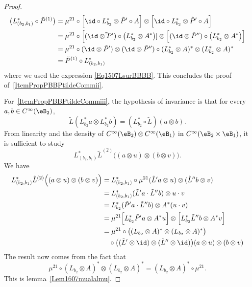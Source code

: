 \begin{proof}
	\begin{equation}
		\begin{aligned}[]
			\big( L^*_{(b_2,b_1)}\circ\tilde P^{(1)} \big)&=
			\mu^{21}\circ\Big[ \id\circ L^*_{b_2}\otimes\tilde P'\circ A \Big]\otimes\Big[  \id\circ L^*_{b_2}\otimes\tilde P'\circ A  \Big]\\
			&=\mu^{21}\circ\Big[(\id\otimes\tilde \tilde P')\circ\big( L^*_{b_2}\otimes A^* \big)]\otimes\Big[  (\id\otimes\tilde P'')\circ\big( L^*_{b_2}\otimes A^* \big)\Big]\\
			&=\mu^{21}\circ(\id\otimes \tilde P')\otimes(\id\otimes\tilde P'')\circ(L^*_{b_2}\otimes A)^*\otimes(L^*_{b_2}\otimes A)^*\\
			&=\tilde P^{(1)}\circ L^*_{(b_2,b_1)}
		\end{aligned}
	\end{equation}
	where we used the expression \eqref{Eq1507LsurBBBB}. This concludes the proof of~\ref{ItemPropPBBPtildeCommii}.

	For~\ref{ItemPropPBBPtildeCommiii}, the hypothesis of invariance is that for every $a,b\in C^{\infty}(\eB_2)$,
	\begin{equation}
		\tilde L(L^*_{b_2}a\otimes L^*_{b_2}b)=(L^*_{b_2}\circ\tilde L)(a\otimes b).
	\end{equation}
	From linearity and the density of $ C^{\infty}(\eB_2)\otimes C^{\infty}(\eB_1)$ in $ C^{\infty}(\eB_2\times\eB_1)$, it is sufficient to study
	\begin{equation}
		L^*_{(b_2,b_1)}\tilde L^{(2)}\Big( (a\otimes u)\otimes(b\otimes v) \Big).
	\end{equation}
	We have
	\begin{equation}
		\begin{aligned}[]
			L^*_{(b_2,b_1)}\tilde L^{(2)}\Big( (a\otimes u)\otimes(b\otimes v) \Big)&=L^*_{(b_2,b_1)}\circ\mu^{21}(\tilde L'a\otimes u)\otimes (\tilde L''b\otimes v)\\
			&=L^*_{(b_2,b_1)}(\tilde L'a\cdot\tilde L''b)\otimes u\cdot v\\
			&=L^*_{b_2}(\tilde P'a\cdot\tilde L''b)\otimes A^*(u\cdot v)\\
			&=\mu^{21}\Big[ L^*_{b_2}\tilde P'a\otimes A^*u \Big]\otimes\Big[ L^*_{b_2}\tilde L''b\otimes A^*v \Big]\\
			&=\mu^{21}\circ\big( (L_{b_2}\otimes A)^*\otimes(L_{b_2}\otimes A)^* \big)\\
			&\quad	\circ\big( (\tilde L'\otimes\id)\otimes(\tilde L''\otimes\id) \big)(a\otimes u)\otimes(b\otimes v)
		\end{aligned}
	\end{equation}
	The result now comes from the fact that
	\begin{equation}
		\mu^{21}\circ(L_{b_2}\otimes A)^*\otimes(L_{b_2}\otimes A)^*=(L_{b_2}\otimes A)^*\circ\mu^{21}.
	\end{equation}
	This is lemma~\ref{Lem1607mualalmu}.
\end{proof}

